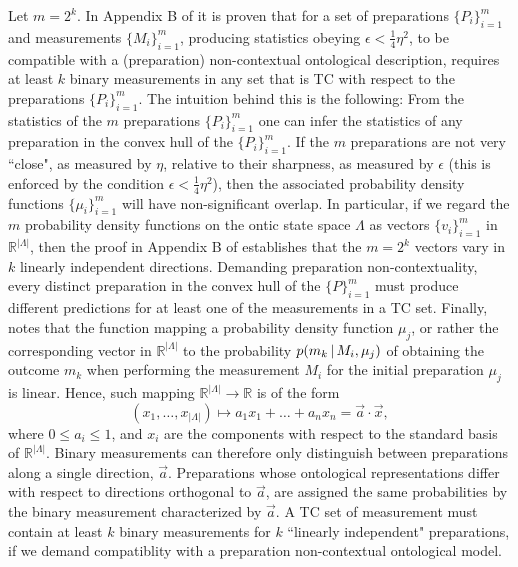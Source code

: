 Let $m=2^k$. In Appendix B of \cite{Pusey2019a} it is proven that for a set of preparations $\{P_i\}_{i=1}^m$ and measurements $\{M_i\}_{i=1}^m$, producing statistics obeying $\epsilon<\frac{1}{4}\eta^2$, to be compatible with a (preparation) non-contextual ontological description, requires at least $k$ binary measurements in any set that is TC with respect to the preparations $\{P_i\}_{i=1}^m$. The intuition behind this is the following: From the statistics of the $m$ preparations $\{P_i\}_{i=1}^m$ one can infer the statistics of any preparation in the convex hull of the $\{P_i\}_{i=1}^m$. If the $m$ preparations are not very ``close", as measured by $\eta$, relative to their sharpness, as measured by $\epsilon$ (this is enforced by the condition $\epsilon<\frac{1}{4}\eta^2$), then the associated probability density functions $\{\mu_i\}_{i=1}^m$ will have non-significant overlap. In particular, if we regard the $m$ probability density functions on the ontic state space $\Lambda$ as vectors $\{v_i\}_{i=1}^m$ in $\mathbb{R}^{\vert \Lambda \vert}$, then the proof in Appendix B of \cite{Pusey2019a} establishes that the $m=2^k$ vectors vary in $k$ linearly independent directions. Demanding preparation non-contextuality, every distinct preparation in the convex hull of the $\{P\}_{i=1}^m$ must produce different predictions for at least one of the measurements in a TC set. Finally, \cite{Pusey2019a} notes that the function mapping a probability density function $\mu_j$, or rather the corresponding vector in $\mathbb{R}^{\vert \Lambda \vert}$ to the probability $p(m_k\thinspace\vert\thinspace M_i,\mu_j)$ of obtaining the outcome $m_k$ when performing the measurement $M_i$ for the initial preparation $\mu_j$ is linear. Hence, such mapping $\mathbb{R}^{\vert \Lambda \vert}\rightarrow\mathbb{R}$ is of the form \[(x_1,\dots,x_{\vert \Lambda \vert})\mapsto a_1 x_1+\dots + a_n x_n = \vec{a}\cdot \vec{x},\] where $0 \leq a_i \leq 1$, and $x_i$ are the components with respect to the standard basis of $\mathbb{R}^{\vert \Lambda \vert}$. Binary measurements can therefore only distinguish between preparations along a single direction, $\vec{a}$. Preparations whose ontological representations differ with respect to directions orthogonal to $\vec{a}$, are assigned the same probabilities by the binary measurement characterized by $\vec{a}$. A TC set of measurement must contain at least $k$ binary measurements for $k$ ``linearly independent" preparations, if we demand compatiblity with a preparation non-contextual ontological model.

